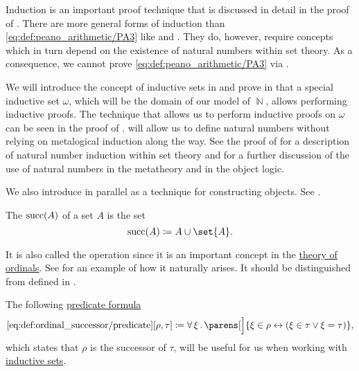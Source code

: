 \begin{remark}\label{rem:inductive_sets}
  Induction is an important proof technique that is discussed in detail in the proof of . There are more general forms of induction than \eqref{eq:def:peano_arithmetic/PA3} like  and . They do, however, require concepts which in turn depend on the existence of natural numbers within set theory. As a consequence, we cannot prove \eqref{eq:def:peano_arithmetic/PA3} via .

  We will introduce the concept of inductive sets in  and prove in  that a special inductive set \hyperref[thm:smallest_inductive_set_existence]{\( \omega \)}, which will be the domain of our model of \( \BbbN \), allows performing inductive proofs. The technique that allows us to perform inductive proofs on \( \omega \) can be seen in the proof of .  will allow us to define natural numbers without relying on metalogical induction along the way. See the proof of  for a description of natural number induction within set theory and  for a further discussion of the use of natural numbers in the metatheory and in the object logic.

  We also introduce  in parallel as a technique for constructing objects. See .
\end{remark}

\begin{definition}\label{def:ordinal_successor}
  The  \( \operatorname{succ}(A) \) of a set \( A \) is the set
  \begin{equation*}
    \op{succ}(A) \coloneqq A \cup \set{ A }.
  \end{equation*}

  It is also called the  operation since it is an important concept in the \hyperref[subsec:ordinal]{theory of ordinals}. See  for an example of how it naturally arises. It should be distinguished from  defined in .

  The following \hyperref[rem:predicate_formula]{predicate formula}
  \begin{equation*}\taglabel[\op{IsSucc}]{eq:def:ordinal_successor/predicate}
    \ref{eq:def:ordinal_successor/predicate}[\rho, \tau] \coloneqq \qforall \xi \parens[\Big]{ \xi \in \rho \leftrightarrow (\xi \in \tau \vee \xi = \tau) },
  \end{equation*}
  which states that \( \rho \) is the successor of \( \tau \), will be useful for us when working with \hyperref[def:inductive_set]{inductive sets}.
\end{definition}

